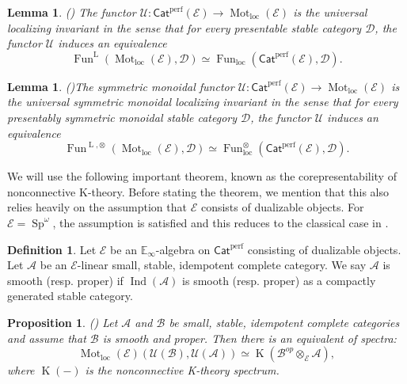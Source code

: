 \documentclass{article}
\newtheorem{lm}[thm]{Lemma}
\newtheorem{prop}[thm]{Proposition}
\theoremstyle{definition}
\newtheorem{defn}[thm]{Definition}
\newcommand{\on}{\operatorname}
\begin{document}
\begin{lm}(\cite[Theorem 5.17]{HSS})
The functor $\mathcal{U}:\mathsf{Cat}^{\on{perf}}(\mathcal{E})\rightarrow \on{Mot}_{\on{loc}}(\mathcal{E})$ is the universal localizing invariant in the sense that for every presentable stable category $\mathcal{D}$, the functor $\mathcal{U}$ induces an equivalence\[
\on{Fun}^{\on{L}}(\on{Mot}_{\on{loc}}(\mathcal{E}),\mathcal{D})\simeq \on{Fun}_{\on{loc}}(\mathsf{Cat}^{\on{perf}}(\mathcal{E}),\mathcal{D}).
\]
\end{lm}
\begin{lm}(\cite[Theorem 5.18]{HSS})\label{u.loc.inv.}
The symmetric monoidal functor $\mathcal{U}:\mathsf{Cat}^{\on{perf}}(\mathcal{E})\rightarrow \on{Mot}_{\on{loc}}(\mathcal{E})$ is the universal symmetric monoidal localizing invariant in the sense that for every presentably symmetric monoidal stable category $\mathcal{D}$, the functor $\mathcal{U}$ induces an equivalence\[
\on{Fun}^{\on{L},\otimes}(\on{Mot}_{\on{loc}}(\mathcal{E}),\mathcal{D})\simeq \on{Fun}^{\otimes}_{\on{loc}}(\mathsf{Cat}^{\on{perf}}(\mathcal{E}),\mathcal{D}).
\]
\end{lm}
We will use the following important theorem, known as the corepresentability of nonconnective K-theory. Before stating the theorem, we mention that this also relies heavily on the assumption that $\mathcal{E}$ consists of dualizable objects. For $\mathcal{E}=\on{Sp}^\omega$, the assumption is satisfied and this reduces to the classical case in \cite{BGT}.
\begin{defn}
Let $\mathcal{E}$ be an $\mathbb{E}_\infty$-algebra on $\mathsf{Cat}^{\on{perf}}$ consisting of dualizable objects. Let $\mathcal{A}$ be an $\mathcal{E}$-linear small, stable, idempotent complete category. We say $\mathcal{A}$ is smooth (resp. proper) if $\on{Ind}(\mathcal{A})$ is smooth (resp. proper) as a compactly generated stable category.
\end{defn}
\begin{prop}(\cite[Theorem 5.25]{HSS})
Let $\mathcal{A}$ and $\mathcal{B}$ be small, stable, idempotent complete categories and assume that $\mathcal{B}$ is smooth and proper. Then there is an equivalent of spectra:
\[\on{Mot}_{\on{loc}}(\mathcal{E})(\mathcal{U}(\mathcal{B}),\mathcal{U}(\mathcal{A}))\simeq \on{K}(\mathcal{B}^{op}\otimes_{\mathcal{E}} \mathcal{A}),
\]
where $\on{K}(-)$ is the nonconnective K-theory spectrum.
\end{prop}
\end{document}
